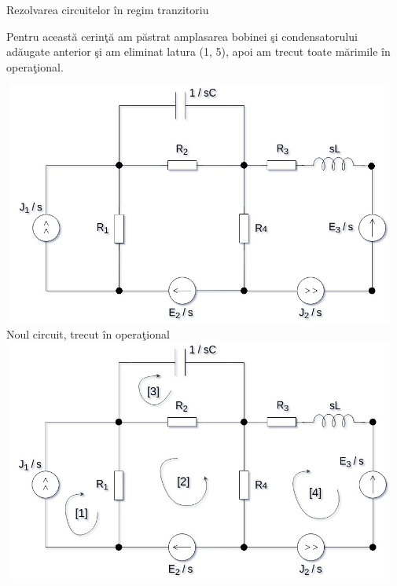 \documentclass[a4paper]{article}
\begin{document}

\begin{section}{Rezolvarea circuitelor \^ in regim tranzitoriu \\[0.5cm]}

	Pentru aceast\u a cerin\c t\u a am p\u astrat amplasarea bobinei \c si condensatorului ad\u augate anterior \c si am eliminat latura (1, 5), apoi am trecut toate m\u arimile \^ in opera\c tional. \\

\begin{center}
	\includegraphics[width=13cm, height=8cm]{operational.jpg} \\
	Noul circuit, trecut \^ in opera\c tional \\[2cm]
	\includegraphics[width=13cm, height=8cm]{opbucle.jpg} \\

\end{center}
\end{section}
\end{document}
